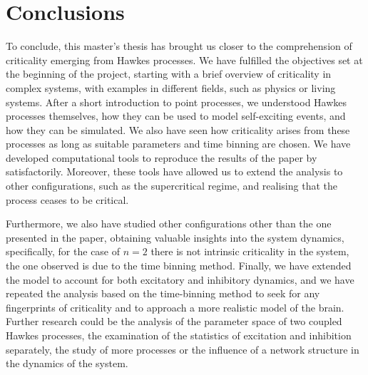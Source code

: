 \chapter{Conclusions}\label{ch:conclusiones}

To conclude, this master's thesis has brought us closer to the comprehension of criticality emerging from Hawkes processes. We have fulfilled the objectives set at the beginning of the project, 
starting with a brief overview of criticality in complex systems, with examples in different fields, such as physics or living systems. After a short introduction to point processes,
we understood Hawkes processes themselves, how they can be used to model self-exciting events, and how they can be simulated. We also have seen how criticality arises from 
these processes as long as suitable parameters and time binning are chosen. 
We have developed computational tools to reproduce the results of the paper by \cite{notarmuzi2021percolation} satisfactorily. Moreover, these tools have allowed us to extend the analysis
to other configurations, such as the supercritical regime, and realising that the process ceases to be critical. 

Furthermore, we also have studied other configurations other than the one presented in the paper, obtaining valuable insights into the system dynamics, specifically, for the case of 
$n=2$ there is not intrinsic criticality in the system, the one observed is due to the time binning method. 
Finally, we have extended the model 
to account for both excitatory and inhibitory dynamics, and we have repeated the analysis based on the time-binning method to seek for any fingerprints of criticality 
and to approach a more realistic model of the brain. Further research could be the analysis of the parameter space of two coupled
Hawkes processes, the examination of the statistics of excitation and inhibition separately, the study of more processes or the influence of a network structure in the dynamics of the system.  
